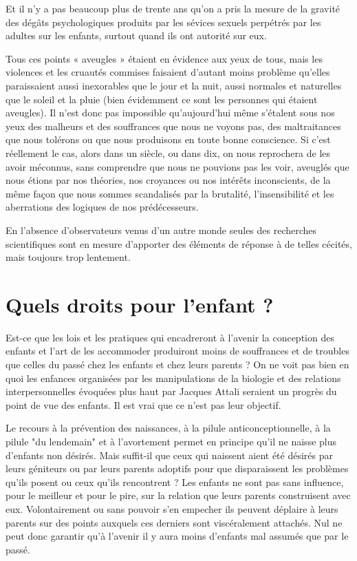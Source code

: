  Et il n'y a pas beaucoup plus de trente ans qu'on a pris la mesure de la gravité des dégâts psychologiques produits par les sévices sexuels perpétrés par les adultes sur les enfants, surtout quand ils ont autorité sur eux. 
 
 Tous ces points « aveugles » étaient en évidence aux yeux de tous, mais les violences et les cruautés commises faisaient d'autant moins problème qu'elles paraissaient aussi inexorables que le jour et la nuit, aussi normales et naturelles que le soleil et la pluie (bien évidemment ce sont les personnes qui étaient aveugles). Il n'est donc pas impossible qu'aujourd'hui même s'étalent sous nos yeux des malheurs et des souffrances que nous ne voyons pas, des maltraitances que nous tolérons ou que nous produisons en toute bonne conscience. Si c'est réellement le cas, alors dans un siècle, ou dans dix, on nous reprochera de les avoir méconnus, sans comprendre que nous ne pouvions pas les voir, aveuglés que nous étions par nos théories, nos croyances ou nos intérêts inconscients, de la même façon que nous sommes scandalisés par la brutalité, l'insensibilité et les aberrations des logiques de nos prédécesseurs. 
 
 En l'absence d'observateurs venus d'un autre monde seules des recherches scientifiques sont en mesure d'apporter des éléments de réponse à de telles cécités, mais toujours trop lentement.
 
 \chapter{Quels droits pour l'enfant ?}
 
 Est-ce que les lois et les pratiques qui encadreront à l'avenir la conception des enfants et l'art de les accommoder produiront moins de souffrances et de troubles que celles du passé chez les enfants et chez leurs parents ? On ne voit pas bien en quoi les enfances organisées par les manipulations de la biologie et des relations interpersonnelles évoquées plus haut par Jacques Attali seraient un progrès du point de vue des enfants. Il est vrai que ce n'est pas leur objectif. 
 

 Le recours à la prévention des naissances, à la pilule anticonceptionnelle, à la pilule "du lendemain" et à l'avortement permet en principe qu'il ne naisse plus d'enfants non désirés. Mais suffit-il que ceux qui naissent aient été désirés par leurs géniteurs ou par leurs parents adoptifs pour que disparaissent les problèmes qu'ils posent ou ceux qu'ils rencontrent ? Les enfants ne sont pas sans influence, pour le meilleur et pour le pire, sur la relation que leurs parents construisent avec eux. Volontairement ou sans pouvoir s'en empecher ils peuvent déplaire à leurs parents sur des points auxquels ces derniers sont viscéralement attachés. Nul ne peut donc garantir qu'à l'avenir il y aura moins d'enfants mal assumés que par le passé. 

